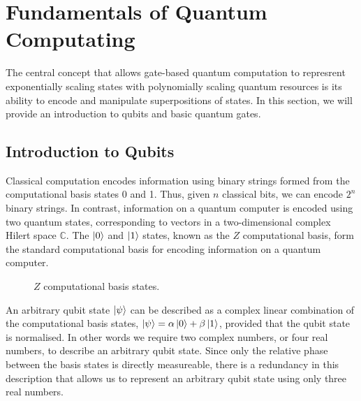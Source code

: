 \section{Fundamentals of Quantum Computating}%
\label{quantum-computation}

The central concept that allows gate-based quantum computation to represrent exponentially scaling states with polynomially scaling quantum resources is its ability to encode and manipulate superpositions of states. In this section, we will provide an introduction to qubits and basic quantum gates.

\subsection{Introduction to Qubits}

Classical computation encodes information using binary strings formed from the computational basis states 0 and 1. Thus, given $n$ classical bits, we can encode $2^n$ binary strings. In contrast, information on a quantum computer is encoded using two quantum states, corresponding to vectors in a two-dimensional complex Hilert space $\mathbb{C}$. The $\ket 0$ and $\ket 1$ states, known as the $Z$ computational basis, form the standard computational basis for encoding information on a quantum computer.

\begin{figure}[H]
    \centering
    \begin{minipage}{.45\textwidth}
        \centering
    \end{minipage}%
    \begin{minipage}{0.45\textwidth}
        \centering
    \end{minipage}
    \caption{$Z$ computational basis states.}
    \label{z-eigenstates}
\end{figure}

An arbitrary qubit state $\ket\psi$ can be described as a complex linear combination of the computational basis states, $\ket\psi = \alpha\ket 0 + \beta\ket 1$, provided that the qubit state is normalised. In other words we require two complex numbers, or four real numbers, to describe an arbitrary qubit state. Since only the relative phase between the basis states is directly measureable, there is a redundancy in this description that allows us to represent an arbitrary qubit state using only three real numbers.

